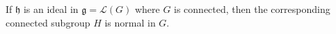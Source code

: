 If $\mathfrak{h}$ is an ideal in $\mathfrak{g} = \mathcal{L}(G)$ where $G$ is connected, then the corresponding connected subgroup $H$ is normal in $G$.
